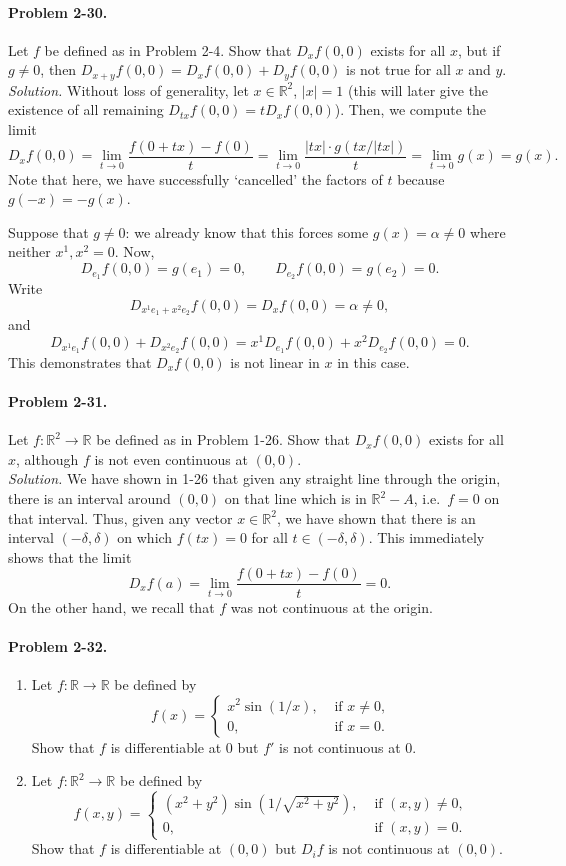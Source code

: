 \documentclass[11pt]{report}
\newcommand{\R}{\mathbb{R}}
\newcommand{\problem}[1]{\paragraph{Problem #1.}}
\newcommand{\solution}{\noindent\textit{Solution.} }
\begin{document}
    
    \problem{2-30} Let $f$ be defined as in Problem 2-4. Show that $D_xf(0, 0)$
    exists for all $x$, but if $g \neq 0$, then $D_{x + y}f(0, 0) = D_xf(0, 0) +
    D_yf(0, 0)$ is not true for all $x$ and $y$. \\

    \solution Without loss of generality, let $x \in \R^2$, $|x| = 1$ (this will
    later give the existence of all remaining $D_{tx}f(0, 0) = t D_xf(0, 0)$). Then,
    we compute the limit \[
        D_xf(0, 0) = \lim_{t \to 0} \frac{f(0 + tx) - f(0)}{t} 
        = \lim_{t \to 0} \frac{|tx|\cdot g(tx / |tx|)}{t} 
        = \lim_{t \to 0} g(x) = g(x).
    \] Note that here, we have successfully `cancelled' the factors of $t$ because
    $g(-x) = -g(x)$.

    Suppose that $g \neq 0$: we already know that this forces some $g(x) =
    \alpha \neq 0$ where neither $x^1, x^2 = 0$. Now, \[
        D_{e_1}f(0, 0) = g(e_1) = 0, \qquad 
        D_{e_2}f(0, 0) = g(e_2) = 0.
    \] Write \[
        D_{x^1e_1 + x^2e_2}f(0, 0) = D_xf(0, 0) = \alpha \neq 0,
    \] and \[
        D_{x^1e_1}f(0, 0) + D_{x^2e_2}f(0, 0) = x^1D_{e_1}f(0, 0) + x^2D_{e_2}f(0, 0)
        = 0.
    \] This demonstrates that $D_xf(0, 0)$ is not linear in $x$ in this case.


    \problem{2-31} Let $f\colon \R^2 \to \R$ be defined as in Problem 1-26. Show that
    $D_xf(0, 0)$ exists for all $x$, although $f$ is not even continuous at $(0, 0)$.
    \\

    \solution We have shown in 1-26 that given any straight line through the origin,
    there is an interval around $(0, 0)$ on that line which is in $\R^2 - A$, i.e.\
    $f = 0$ on that interval. Thus, given any vector $x \in \R^2$, we have shown that
    there is an interval $(-\delta, \delta)$ on which $f(tx) = 0$ for all $t \in
    (-\delta, \delta)$. This immediately shows that the limit \[
        D_xf(a) = \lim_{t \to 0} \frac{f(0 + tx) - f(0)}{t} = 0.
    \] On the other hand, we recall that $f$ was not continuous at the origin.


    \problem{2-32} \begin{enumerate}
        \item Let $f\colon \R \to \R$ be defined by \[
            f(x) = \begin{cases}
                x^2 \sin(1 / x), &\text{ if }x \neq 0, \\
                0, &\text{ if }x = 0.
            \end{cases}
        \] Show that $f$ is differentiable at $0$ but $f'$ is not continuous at $0$.
        
        \item Let $f\colon \R^2 \to \R$ be defined by \[
            f(x, y) = \begin{cases}
                (x^2 + y^2) \sin(1 / \sqrt{x^2 + y^2}), &\text{ if }(x, y) \neq 0, \\
                0, &\text{ if }(x, y) = 0.
            \end{cases}
        \] Show that $f$ is differentiable at $(0, 0)$ but $D_if$ is not continuous
        at $(0, 0)$.
    \end{enumerate}
\end{document}
